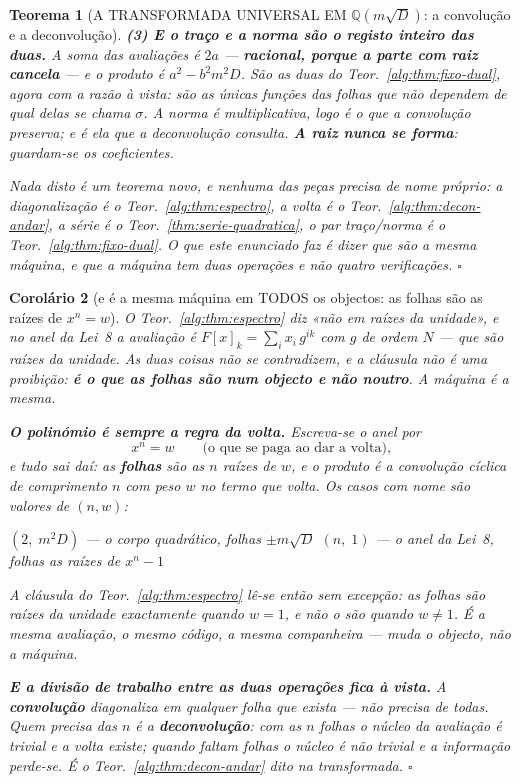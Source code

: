 \documentclass[11pt,a4paper]{article}
\newtheorem{teorema}{Teorema}
\newtheorem{corolario}[teorema]{Corolário}
\begin{document}
\begin{teorema}[A TRANSFORMADA UNIVERSAL EM $\mathbb{Q}(m\sqrt D)$: a convolução e a
deconvolução]
\textbf{(3) E o traço e a norma são o registo inteiro das duas.} A soma das avaliações é
$2a$ --- \textbf{racional, porque a parte com raiz cancela} --- e o produto é
$a^{2}-b^{2}m^{2}D$. São as duas do Teor.~\ref{alg:thm:fixo-dual}, agora com a razão à vista:
\emph{são as únicas funções das folhas que não dependem de qual delas se chama $\sigma$}.
A norma é multiplicativa, logo é o que a convolução preserva; e é ela que a deconvolução
consulta. \textbf{A raiz nunca se forma}: guardam-se os coeficientes.

\medskip
\noindent Nada disto é um teorema novo, e nenhuma das peças precisa de nome próprio: a
diagonalização é o Teor.~\ref{alg:thm:espectro}, a volta é o Teor.~\ref{alg:thm:decon-andar}, a
série é o Teor.~\ref{thm:serie-quadratica}, o par traço/norma é o Teor.~\ref{alg:thm:fixo-dual}.
\emph{O que este enunciado faz é dizer que são a mesma máquina}, e que a máquina tem duas
operações e não quatro verificações. $\square$
\end{teorema}
\begin{corolario}[e é a mesma máquina em TODOS os objectos: as folhas são as raízes de
$x^{n}=w$]\label{cor:folhas-do-polinomio}
O Teor.~\ref{alg:thm:espectro} diz \emph{«não em raízes da unidade»}, e no anel da Lei~8 a
avaliação é $F[x]_k=\sum_i x_i\,g^{ik}$ com $g$ de ordem $N$ --- que são raízes da unidade.
As duas coisas não se contradizem, e a cláusula não é uma proibição: \textbf{é o que as
folhas são num objecto e não noutro}. A máquina é a mesma.

\textbf{O polinómio é sempre a regra da volta.} Escreva-se o anel por
\[
x^{n}=w \qquad\text{(o que se paga ao dar a volta),}
\]
e tudo sai daí: as \textbf{folhas} são as $n$ raízes de $w$, e o produto é a convolução
cíclica de comprimento $n$ com peso $w$ no termo que volta. Os casos com nome são valores
de $(n,w)$:
\begin{center}
$(2,\;m^{2}D)$ --- o corpo quadrático, folhas $\pm m\sqrt D$ \qquad
$(n,\;1)$ --- o anel da Lei~8, folhas as raízes de $x^{n}-1$
\end{center}
\emph{A cláusula do Teor.~\ref{alg:thm:espectro} lê-se então sem excepção}: as folhas são
raízes da unidade exactamente quando $w=1$, e não o são quando $w\neq1$. É a mesma
avaliação, o mesmo código, a mesma companheira --- muda o objecto, não a máquina.

\textbf{E a divisão de trabalho entre as duas operações fica à vista.} A
\textbf{convolução} diagonaliza em \emph{qualquer} folha que exista --- não precisa de
todas. Quem precisa das $n$ é a \textbf{deconvolução}: com as $n$ folhas o núcleo da
avaliação é trivial e a volta existe; quando faltam folhas o núcleo é não trivial e a
informação perde-se. É o Teor.~\ref{alg:thm:decon-andar} dito na transformada. $\square$
\end{corolario}
\end{document}

